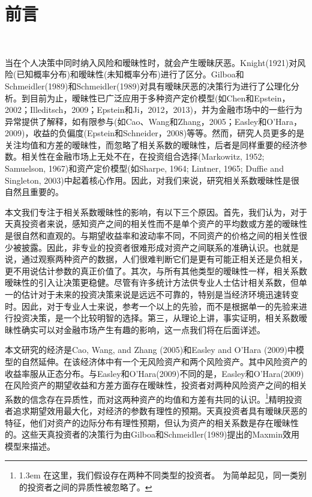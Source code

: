 \documentclass[10.0pt]{article}
\begin{document}
\section{前言}

\quad \ 


当在个人决策中同时纳入风险和暧昧性时，就会产生暧昧厌恶。Knight(1921)对风险(已知概率分布)和暧昧性(未知概率分布)进行了区分。Gilboa和Schmeidler(1989)和Schmeidler(1989)对具有暧昧厌恶的决策行为进行了公理化分析。到目前为止，暧昧性已广泛应用于多种资产定价模型(如Chen和Epstein，2002；Illeditsch，2009；Epstein和Ji，2012，2013)，并为金融市场中的一些行为异常提供了解释，如有限参与(如Cao、Wang和Zhang，2005；Easley和O'Hara，2009)，收益的负偏度(Epstein和Schneider，2008)等等。然而，研究人员更多的是关注均值和方差的暧昧性，而忽略了相关系数的暧昧性，后者是同样重要的经济参数。相关性在金融市场上无处不在，在投资组合选择(Markowitz, 1952; Samuelson, 1967)和资产定价模型(如Sharpe, 1964; Lintner, 1965; Duffie and Singleton, 2003)中起着核心作用。因此，对我们来说，研究相关系数暧昧性是很自然且重要的。


本文我们专注于相关系数暧昧性的影响，有以下三个原因。首先，我们认为，对于天真投资者来说，感知资产之间的相关性而不是单个资产的平均数或方差的暧昧性是很自然和直观的。与期望收益率和波动率不同，不同资产的价格之间的相关性很少被披露。因此，非专业的投资者很难形成对资产之间联系的准确认识。也就是说，通过观察两种资产的数据，人们很难判断它们是更有可能正相关还是负相关，更不用说估计参数的真正价值了。其次，与所有其他类型的暧昧性一样，相关系数暧昧性的引入让决策更稳健。尽管有许多统计方法供专业人士估计相关系数，但单一的估计对于未来的投资决策来说是远远不可靠的，特别是当经济环境迅速转变时。因此，对于专业人士来说，参考一个以上的先验，而不是根据单一的先验来进行投资决策，是一个比较明智的选择。第三，从理论上讲，事实证明，相关系数暧昧性确实可以对金融市场产生有趣的影响，这一点我们将在后面详述。



本文研究的经济是Cao, Wang, and Zhang (2005)和Easley and O'Hara (2009)中模型的自然延伸。在该经济体中有一个无风险资产和两个风险资产。其中风险资产的收益率服从正态分布。与Easley和O'Hara(2009)不同的是，Easley和O'Hara(2009)在风险资产的期望收益和方差方面存在暧昧性，投资者对两种风险资产之间的相关系数的信念存在异质性，而对这两种资产的均值和方差有共同的认识。\footnote{\baselineskip1.3em 在这里，我们假设存在两种不同类型的投资者。 为简单起见，同一类别的投资者之间的异质性被忽略了。}精明投资者追求期望效用最大化，对经济的参数有理性的预期。天真投资者具有暧昧厌恶的特征，他们对资产的边际分布有理性预期，但认为资产的相关系数是存在暧昧性的。这些天真投资者的决策行为由Gilboa和Schmeidler(1989)提出的Maxmin效用模型来描述。
\end{document}
